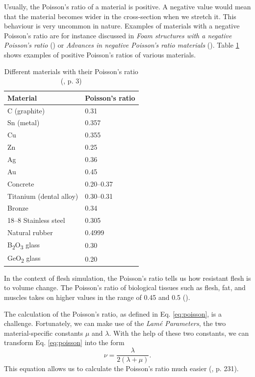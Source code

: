 Usually, the Poisson's ratio of a material is positive. A negative value would mean that the material becomes wider in the cross-section when we stretch it. This behaviour is very uncommon in nature. Examples of materials with a negative Poisson's ratio are for instance discussed in \textit{Foam structures with a negative Poisson's ratio} (\cite{lakes1987foam}) or \textit{Advances in negative Poisson's ratio materials} (\cite{lakes1993advances}). Table \ref{table:1} shows examples of positive Poisson's ratios of various materials.

\setlength{\tabcolsep}{0.5em} %
{\renewcommand{\arraystretch}{1.1}%
\begin{table}[!htbp]
\centering
    \begin{tabular}{ | l | l |}
    \hline
    \textbf{Material} & \textbf{Poisson's ratio} \\ \hline
    C (graphite) & 0.31 \\ \hline
    Sn (metal) & 0.357 \\ \hline
    Cu & 0.355 \\ \hline
    Zn & 0.25 \\ \hline
    Ag & 0.36 \\ \hline
    Au & 0.45 \\ \hline
    Concrete & 0.20–0.37 \\ \hline
    Titanium (dental alloy) & 0.30–0.31 \\ \hline
    Bronze & 0.34 \\ \hline
    18–8 Stainless steel & 0.305 \\ \hline
    Natural rubber & 0.4999 \\ \hline
	B\textsubscript{2}O\textsubscript{3} glass & 0.30 \\ \hline
	GeO\textsubscript{2} glass & 0.20 \\ \hline	
    \end{tabular}
    \caption[Materials with their Poisson's ratio]{Different materials with their Poisson's ratio (\cite{PhysRevB.80.132104}, p. 3)}
\label{table:1}
\end{table}

In the context of flesh simulation, the Poisson's ratio tells us how resistant flesh is to volume change. The
Poisson's ratio of biological tissues such as flesh, fat, and muscles takes on higher values in the range of 0.45 and 0.5 (\cite{Smith:2018:SNF:3191713.3180491}).

The calculation of the Poisson's ratio, as defined in Eq. \eqref{eq:poisson}, is a challenge. Fortunately, we can make use of the \textit{Lamé Parameters}, the two material-specific constants $\mu$ and $\lambda$. With the help of these two constants, we can transform Eq. \eqref{eq:poisson} into the form
\begin{equation}\label{eq:poisson_ratio}
\nu =  \frac{\lambda}{2(\lambda + \mu)}.
\end{equation}
This equation allows us to calculate the Poisson's ratio much easier (\cite{BERGSTROM2015209}, p. 231).

}

